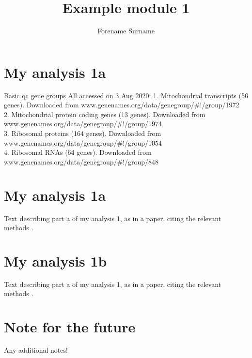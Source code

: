 \documentclass{article}
\begin{document}
\title{Example module 1}
\author{Forename Surname}

\maketitle

\section{My analysis 1a}

Basic qc gene groups All accessed on 3 Aug 2020:
1. Mitochondrial transcripts (56 genes). Downloaded from www.genenames.org/data/genegroup/\#!/group/1972 \\ 
2. Mitochondrial protein coding genes (13 genes). Downloaded from www.genenames.org/data/genegroup/\#!/group/1974 \\ 
3. Ribosomal proteins (164 genes). Downloaded from www.genenames.org/data/genegroup/\#!/group/1054 \\ 
4. Ribosomal RNAs (64 genes). Downloaded from www.genenames.org/data/genegroup/\#!/group/848 


\section{My analysis 1a}

Text describing part a of my analysis 1, as in a paper, citing the relevant methods \citep{article_1,article_2}. 

\section{My analysis 1b}

Text describing part a of my analysis 1, as in a paper, citing the relevant methods \citep{article_3}. 

\section{Note for the future}

Any additional notes!



\end{document}
